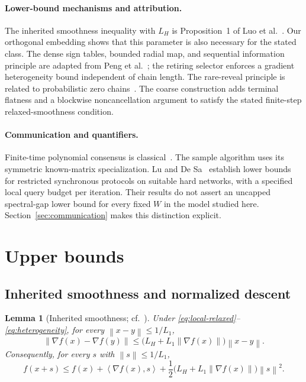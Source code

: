\documentclass[11pt,a4paper]{article}
\newcommand{\norm}[1]{\left\lVert #1\right\rVert}
\newcommand{\inner}[2]{\left\langle #1,#2\right\rangle}
\newtheorem{lemma}[theorem]{Lemma}
\theoremstyle{remark}
\begin{document}
\paragraph{Lower-bound mechanisms and attribution.}
The inherited smoothness inequality with $L_H$ is Proposition~1 of
Luo et al.~\cite{relaxed2025}. Our orthogonal embedding shows that this
parameter is also necessary for the stated class. The dense sign tables,
bounded radial map, and sequential information principle are adapted from
Peng et al.~\cite{dense2026}; the retiring selector enforces a gradient
heterogeneity bound independent of chain length. The rare-reveal principle
is related to probabilistic zero chains~\cite{arjevani2022}. The coarse
construction adds terminal flatness and a blockwise noncancellation
argument to satisfy the stated finite-step relaxed-smoothness condition.

\paragraph{Communication and quantifiers.}
Finite-time polynomial consensus is classical~\cite{finiteconsensus2007}.
The sample algorithm uses its symmetric known-matrix specialization.
Lu and De Sa~\cite{ludesa2021} establish lower bounds for restricted
synchronous protocols on suitable hard networks, with a specified local
query budget per iteration. Their results do not assert an uncapped
spectral-gap lower bound for every fixed $W$ in the model studied here.
Section~\ref{sec:communication} makes this distinction explicit.

\section{Upper bounds}\label{sec:upper-main}
\subsection{Inherited smoothness and normalized descent}

\begin{lemma}[Inherited smoothness; cf.~\cite{relaxed2025}]
\label{lem:global-relaxed}
Under \eqref{eq:local-relaxed}--\eqref{eq:heterogeneity}, for every
$\norm{x-y}\le1/L_1$,
\begin{equation}
 \norm{\nabla f(x)-\nabla f(y)}
 \le\bigl(L_H+L_1\norm{\nabla f(x)}\bigr)\norm{x-y}.
 \label{eq:global-relaxed}
\end{equation}
Consequently, for every $s$ with $\norm{s}\le1/L_1$,
\begin{equation}
 f(x+s)
 \le f(x)+\inner{\nabla f(x)}{s}
 +\frac12\bigl(L_H+L_1\norm{\nabla f(x)}\bigr)\norm{s}^2.
 \label{eq:descent}
\end{equation}
\end{lemma}
\end{document}
